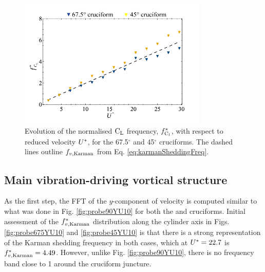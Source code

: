 \documentclass[oneside]{utmthesis}
\begin{document}
\begin{figure}[H]
  \centering
  \includegraphics[width=0.8\textwidth]{figs/clFreq43}
  \caption{Evolution of the normalised $\text{C}_{\text{L}}$ frequency, $f_{\text{C}_{l}}^{*}$, with respect to reduced velocity $U^{*}$, for the 67.5$^{\circ}$ and 45$^{\circ}$ cruciforms. The dashed lines outline $f_{v,\text{Karman}}$ from Eq. \ref{eq:karmanSheddingFreq}.}
  \label{fig:clFreq43}
\end{figure}

\subsection{Main vibration-driving vortical structure}\label{ssec:transitionalRegimeVortStruct}

As the first step, the FFT of the $y$-component of velocity is computed similar to what was done in Fig. \ref{fig:probe90YU10} for both the \angfo{} and \angth{} cruciforms. Initial assessment of the $f^{*}_{v,\text{Karman}}$ distribution along the cylinder axis in Figs. \ref{fig:probe675YU10} and \ref{fig:probe45YU10} is that there is a strong representation of the Karman shedding frequency in both cases, which at $U^{*} = 22.7$ is $f^{*}_{v,\text{Karman}} = 4.49$. However, unlike Fig. \ref{fig:probe90YU10}, there is no frequency band close to 1 around the cruciform juncture.
\end{document}
